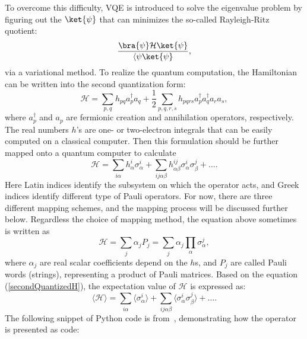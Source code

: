 To overcome this difficulty, VQE is introduced to solve the eigenvalue problem by figuring out the $\ket{\psi}$ that can minimizes the so-called Rayleigh-Ritz quotient:
\begin{equation}
    \frac{\bra{\psi}\mathcal{H}\ket{\psi}}{\langle\psi\ket{\psi}},
\end{equation}
via a variational method. To realize the quantum computation, the Hamiltonian can be written into the second quantization form:
\begin{equation}
    \mathcal{H}=\sum_{p,q}h_{pq}a^\dagger_pa_q+\frac{1}{2}\sum_{p,q,r,s}h_{pqrs}a^\dagger_pa^\dagger_q a_r a_s,
    \label{eqn:secondQuantizedHam}
\end{equation}
where $a^\dagger_p$ and $a_p$ are fermionic creation and annihilation operators, respectively. The real numbers $h$'s are one- or two-electron integrals that can be easily computed on a classical computer. Then this formulation should be further mapped onto a quantum computer to calculate
\begin{equation}
    \label{secondQuantizedH}
    \mathcal{H}=\sum_{i\alpha}h^i_\alpha\sigma^i_\alpha + \sum_{ij\alpha\beta}h^{ij}_{\alpha\beta}\sigma^i_\alpha\sigma^j_\beta+\dots.
\end{equation}
 Here Latin indices identify the subsystem on which the operator acts, and Greek indices identify different type of Pauli operators. For now, there are three different mapping schemes, and the mapping process will be discussed further below. Regardless the choice of mapping method, the equation above sometimes is written as
 \begin{equation}
    \mathcal{H}=\sum_j\alpha_j P_j=\sum_j\alpha_j\prod_\alpha\sigma_\alpha^j,
 \end{equation}
 where $\alpha_j$ are real scalar coefficients depend on the $h$s, and $P_j$ are called Pauli words (strings), representing a product of Pauli matrices.
 Based on the equation (\ref{secondQuantizedH}), the expectation value of $\mathcal{H}$ is expressed as:
 \begin{equation}
    \langle\mathcal{H}\rangle=\sum_{i\alpha}\langle\sigma_\alpha^i\rangle+\sum_{ij\alpha\beta}\langle\sigma_\alpha^i\sigma_\beta^j\rangle+\dots.
 \end{equation}
 The following snippet of Python code is from~\cite{IBMQuantumVQE}, demonstrating how the operator is presented as code:
